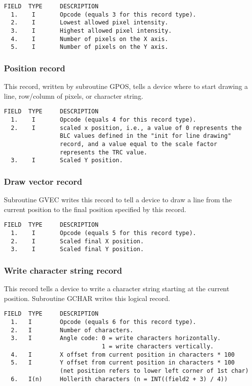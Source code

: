 \begin{verbatim}
FIELD  TYPE     DESCRIPTION
  1.    I       Opcode (equals 3 for this record type).
  2.    I       Lowest allowed pixel intensity.
  3.    I       Highest allowed pixel intensity.
  4.    I       Number of pixels on the X axis.
  5.    I       Number of pixels on the Y axis.

\end{verbatim}
\subsubsection{Position record}
This record, written by subroutine GPOS, tells a device where to start
drawing a line, row/column of pixels, or character string.

\begin{verbatim}
FIELD  TYPE     DESCRIPTION
  1.    I       Opcode (equals 4 for this record type).
  2.    I       scaled x position, i.e., a value of 0 represents the
                BLC values defined in the "init for line drawing"
                record, and a value equal to the scale factor
                represents the TRC value.
  3.    I       Scaled Y position.

\end{verbatim}
\subsubsection{Draw vector record}
Subroutine GVEC writes this record to tell a device to draw a
line from the current position to the final position specified by this
record.

\begin{verbatim}
FIELD  TYPE     DESCRIPTION
  1.    I       Opcode (equals 5 for this record type).
  2.    I       Scaled final X position.
  3.    I       Scaled final Y position.

\end{verbatim}
\subsubsection{Write character string record}
This record tells a device to write a character string starting at the
current position.  Subroutine GCHAR writes this logical record.

\begin{verbatim}
FIELD  TYPE     DESCRIPTION
  1.   I        Opcode (equals 6 for this record type).
  2.   I        Number of characters.
  3.   I        Angle code: 0 = write characters horizontally.
                            1 = write characters vertically.
  4.   I        X offset from current position in characters * 100
  5.   I        Y offset from current position in characters * 100
                (net position refers to lower left corner of 1st char)
  6.   I(n)     Hollerith characters (n = INT((field2 + 3) / 4))

\end{verbatim}
